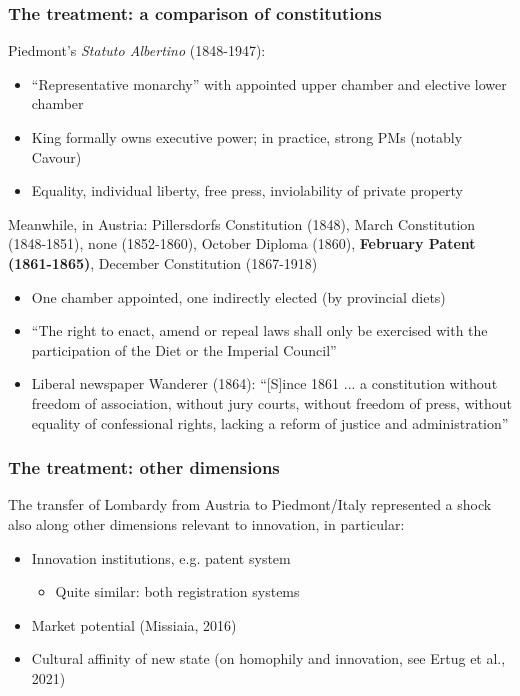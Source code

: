 \documentclass[10pt]{beamer}
\begin{document}
\begin{frame}
    \frametitle{The treatment: a comparison of constitutions}
    
    Piedmont's \textit{Statuto Albertino} (1848-1947):
    \begin{itemize}
        \item ``Representative monarchy'' with appointed upper chamber and elective lower chamber 
        \item King formally owns executive power; in practice, strong PMs (notably Cavour)
        \item Equality, individual liberty, free press, inviolability of private property
    \end{itemize}

    \pause
    \bigskip
    
    Meanwhile, in Austria: Pillersdorfs Constitution (1848), March Constitution (1848-1851), none (1852-1860), October Diploma (1860), \textbf{February Patent (1861-1865)}, December Constitution (1867-1918)

    \begin{itemize}
        \item One chamber appointed, one indirectly elected (by provincial diets) 
        \item ``The right to enact, amend or repeal laws shall only be exercised with the participation of the Diet or the Imperial Council''
        \item Liberal newspaper Wanderer (1864): ``[S]ince 1861 ... a constitution without freedom of association, without jury courts, without freedom of press, without equality of confessional rights, lacking a reform of justice and administration''
    \end{itemize}

\end{frame}

\begin{frame}
    \frametitle{The treatment: other dimensions}
    
    The transfer of Lombardy from Austria to Piedmont/Italy represented a shock also along other dimensions relevant to innovation, in particular:

    \begin{itemize}
        \item Innovation institutions, e.g. patent system

        \begin{itemize}
            \item Quite similar: both registration systems 
        \end{itemize}

        \item Market potential (Missiaia, 2016)
        \item Cultural affinity of new state (on homophily and innovation, see Ertug et al., 2021)
    \end{itemize}
    
\end{frame}
    
\end{document}
